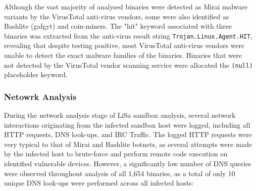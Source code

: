 Although the vast majority of analysed binaries were detected as Mirai malware variants by the VirusTotal anti-virus vendors, some were also identified as Bashlite (gafgyt) and coin-miners. The "hit" keyword associated with three binaries was extracted from the anti-virus result string \texttt{Trojan.Linux.Agent.HIT}, revealing that despite testing positive, most VirusTotal anti-virus vendors were unable to detect the exact malware families of the binaries. Binaries that were not detected by the VirusTotal vendor scanning service were allocated the \texttt{(null)} placeholder keyword. 






















\subsubsection{Netowrk Analysis}

During the network analysis stage of LiSa sandbox analysis, several network interactions originating from the infected sandbox host were logged, including all HTTP requests, DNS look-ups, and IRC Traffic. The logged HTTP requests were very typical to that of Mirai and Bashlite botnets, as several attempts were made by the infected host to brute-force and perform remote code execution on identified vulnerable devices. However, a significantly low number of DNS queries were observed throughout analysis of all 1,654 binaries, as a total of only 10 unique DNS look-ups were performed across all infected hosts:

